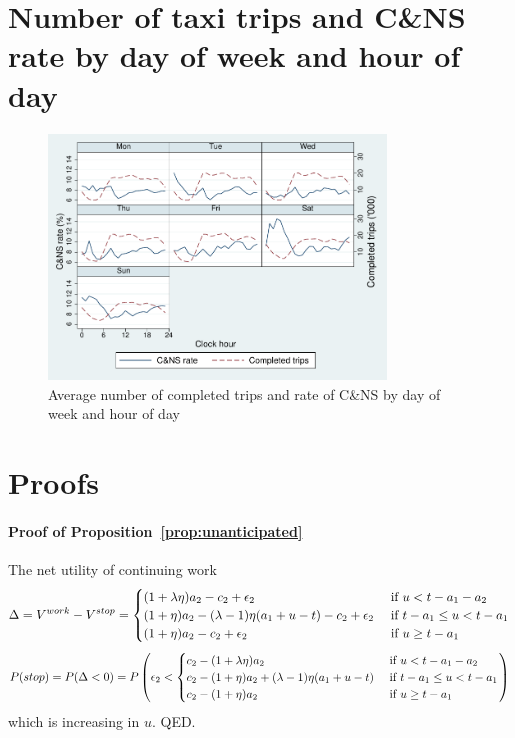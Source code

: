 \documentclass[reviewmode,AEJ]{AEA}
\begin{document}
\begin{appendices}
\section{Number of taxi trips and C\&NS rate by day of week and hour of day}
\FloatBarrier
\begin{figure}[!ht]
	\centering
	\includegraphics[width=0.8\textwidth]{./fg/dowplot.pdf}
	\caption{Average number of completed trips and rate of C\&NS by day of week and hour of day}
	\label{fg:trips}
\end{figure}


\FloatBarrier

\section{Proofs}
\label{apx:proofs}
\paragraph{Proof of Proposition~\ref{prop:unanticipated}} The net utility of continuing work
\[\Delta = V^{work} - V^{stop} = \begin{cases} 
(1+\lambda\eta)a_2 - c_2 + \epsilon_2 & \hbox{ if } u < t - a_1 - a_2 \\
(1+\eta)a_2 - (\lambda-1)\eta(a_1 + u - t) - c_2 + \epsilon_2 & \hbox{ if } t-a_1 \leq u < t - a_1 \\ 
(1+\eta)a_2 - c_2 + \epsilon_2 & \hbox{ if } u \geq t - a_1
\end{cases}\]
\[P(stop) = P(\Delta < 0) = P\left(\epsilon_2 < \begin{cases} 
c_2 - (1+\lambda\eta)a_2 & \hbox{ if } u < t - a_1 - a_2 \\
c_2 - (1+\eta)a_2 + (\lambda-1)\eta(a_1 + u - t) & \hbox{ if } t-a_1 \leq u < t - a_1 \\ 
c_2 - (1+\eta)a_2 & \hbox{ if } u \geq t - a_1\\
\end{cases}\right) 
\]
which is increasing in $u$. QED.


\end{appendices}
\end{document}
